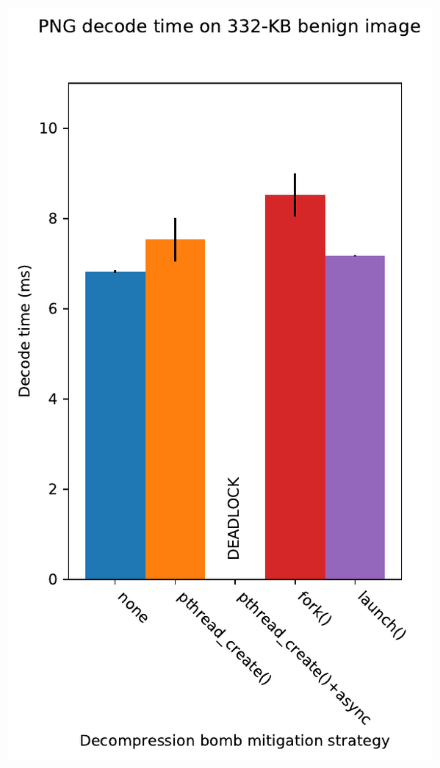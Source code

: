 \begin{figure}[t]
	\begin{minipage}{0.46\textwidth}
	\includegraphics[width=\textwidth]{figs/cerberus2_nns16_surplus256k_mirjam}
	\label{fig:libpng:benign}
	\end{minipage}
%
	\begin{minipage}{0.48\textwidth}

\end{minipage}
\end{figure}
